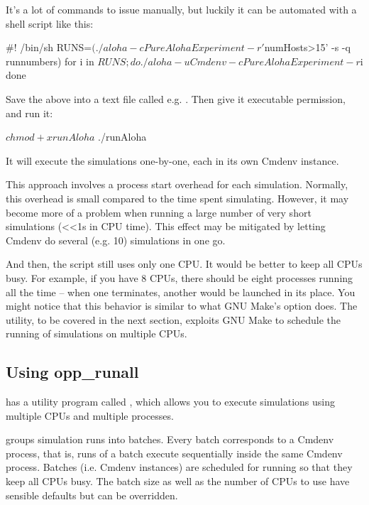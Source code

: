 It's a lot of commands to issue manually, but luckily it can be automated with a
shell script like this:

\begin{filelisting}
#! /bin/sh
RUNS=$(./aloha -c PureAlohaExperiment -r '$numHosts>15' -s -q runnumbers)
for i in $RUNS; do
    ./aloha -u Cmdenv -c PureAlohaExperiment -r $i
done
\end{filelisting}

Save the above into a text file called e.g. . Then give it
executable permission, and run it:

\begin{commandline}
$ chmod +x runAloha
$ ./runAloha
\end{commandline}

It will execute the simulations one-by-one, each in its own Cmdenv instance.

This approach involves a process start overhead for each simulation.
Normally, this overhead is small compared to the time spent simulating. However,
it may become more of a problem when running a large number of very short
simulations (<<1s in CPU time). This effect may be mitigated by letting Cmdenv
do several (e.g. 10) simulations in one go. 

And then, the script still uses only one CPU. It would be better to keep
all CPUs busy. For example, if you have 8 CPUs, there should be eight processes
running all the time -- when one terminates, another would be launched in its place.
You might notice that this behavior is similar to what GNU Make's
 option does. The  utility, to be covered
in the next section, exploits GNU Make to schedule the running of simulations on
multiple CPUs.


\subsection{Using opp\_runall}
\label{sec:run-sim:batches-using-opp-runall}

{\opp} has a utility program called , which allows you to
execute simulations using multiple CPUs and multiple processes.

 groups simulation runs into batches. Every batch
corresponds to a Cmdenv process, that is, runs of a batch execute sequentially
inside the same Cmdenv process. Batches (i.e. Cmdenv instances) are scheduled
for running so that they keep all CPUs busy. The batch size as well as the
number of CPUs to use have sensible defaults but can be overridden.


